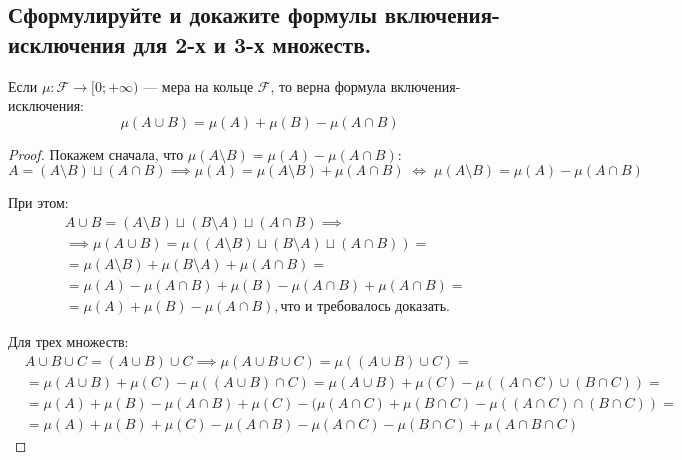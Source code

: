 
\subsection{Сформулируйте и докажите формулы включения-исключения для 2-х и 3-х множеств.}

    Если $\mu : \mathcal{F} \to [0; +\infty)$ --- мера на кольце $\mathcal{F}$, 
    то верна формула включения-исключения:
    \[ \mu(A \cup B) = \mu(A) + \mu(B) - \mu(A \cap B) \]
    \begin{proof}
        Покажем сначала, что $\mu(A \setminus B) = \mu(A) - \mu(A \cap B)$:
        \[ A = (A \setminus B) \sqcup (A \cap B) \implies \mu(A) = \mu(A \setminus B) + \mu(A \cap B) \; 
        \Leftrightarrow \; \mu(A \setminus B) = \mu(A) - \mu(A \cap B) \]
        
        При этом: 
        \begin{align*}
            & A \cup B = (A \setminus B) \sqcup (B \setminus A) \sqcup (A \cap B) \implies \\[5 pt]
            & \implies \mu(A \cup B)
            = \mu((A \setminus B) \sqcup (B \setminus A) \sqcup (A \cap B)) = \\[5 pt]
            & = \mu(A \setminus B) + \mu(B \setminus A) + \mu(A \cap B) = \\[5 pt]
            & = \mu(A) - \mu(A \cap B) + \mu(B) - \mu(A \cap B) + \mu(A \cap B) = \\[5 pt]
            & = \mu(A) + \mu(B) - \mu(A \cap B), \text{что и требовалось доказать.}
        \end{align*}
        
        Для трех множеств:
        \begin{align*}
            & A \cup B \cup C = (A \cup B) \cup C \implies \mu(A \cup B \cup C)
            = \mu((A \cup B) \cup C) = \\[5 pt]
            & = \mu(A \cup B) + \mu(C) - \mu((A \cup B) \cap C)
            = \mu(A \cup B) + \mu(C) - \mu((A \cap C) \cup (B \cap C)) = \\[5 pt]
            & = \mu(A) + \mu(B) - \mu(A \cap B) + \mu(C)
            - (\mu(A \cap C) + \mu(B \cap C) - \mu((A \cap C) \cap (B \cap C)) = \\[5 pt]
            & = \mu(A) + \mu(B) + \mu(C) - \mu(A \cap B) - \mu(A \cap C) - \mu(B \cap C)
            + \mu(A \cap B \cap C)
        \end{align*}
    \end{proof}
    
